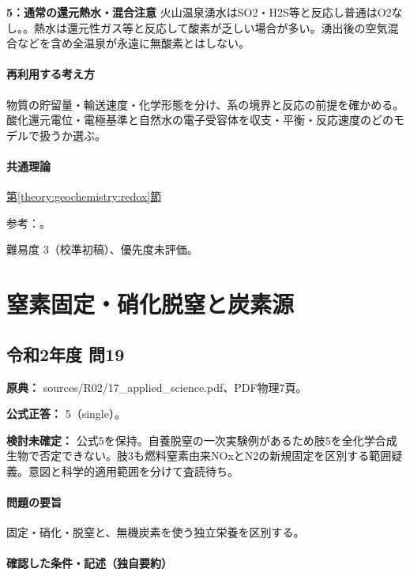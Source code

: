 \noindent\textbf{5：通常の還元熱水・混合注意} 火山温泉湧水はSO2・H2S等と反応し普通はO2なし。。熱水は還元性ガス等と反応して酸素が乏しい場合が多い。湧出後の空気混合などを含め全温泉が永遠に無酸素とはしない。\par

\paragraph{再利用する考え方} 物質の貯留量・輸送速度・化学形態を分け、系の境界と反応の前提を確かめる。酸化還元電位・電極基準と自然水の電子受容体を収支・平衡・反応速度のどのモデルで扱うか選ぶ。

\paragraph{共通理論} \hyperref[theory:geochemistry:redox]{第\ref*{theory:geochemistry:redox}節}

\par 参考：\cite{gc_hem,gc_redox,gc_redox2009}。

\par 難易度 3（校準初稿）、優先度未評価。

\section{窒素固定・硝化脱窒と炭素源}

\subsection{令和2年度 問19}
\label{q:r02-reg-applied-19}

\noindent\textbf{原典：} sources/R02/17\_applied\_science.pdf、PDF物理7頁。

\textbf{公式正答：} 5（single）。

\par\textbf{検討未確定：} 公式5を保持。自養脱窒の一次実験例があるため肢5を全化学合成生物で否定できない。肢3も燃料窒素由来NOxとN2の新規固定を区別する範囲疑義。意図と科学的適用範囲を分けて査読待ち。

\paragraph{問題の要旨} 固定・硝化・脱窒と、無機炭素を使う独立栄養を区別する。

\paragraph{確認した条件・記述（独自要約）}\mbox{}\par

